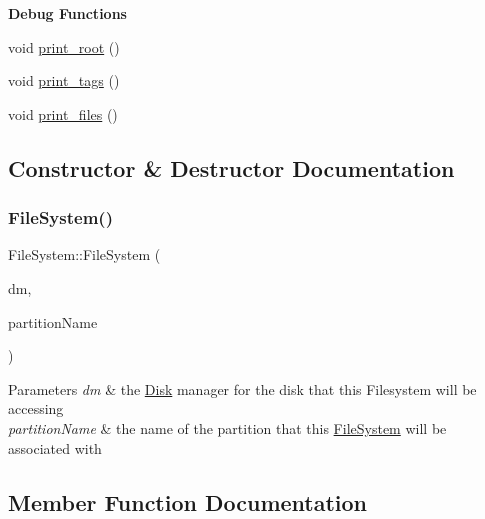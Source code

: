 \begin{Indent}\textbf{ Debug Functions}\par
\begin{DoxyCompactItemize}
\item 
void \mbox{\hyperlink{classFileSystem_a8ec00d561e8d7510358618b249cc60d1}{print\+\_\+root}} ()
\item 
void \mbox{\hyperlink{classFileSystem_ab76af13f044c3ca52e8503a9695685bd}{print\+\_\+tags}} ()
\item 
void \mbox{\hyperlink{classFileSystem_a8d51e4c73c71d91d94ae91355f36bdb1}{print\+\_\+files}} ()
\end{DoxyCompactItemize}
\end{Indent}


\subsection{Constructor \& Destructor Documentation}
\mbox{\label{classFileSystem_a1466c6d1e9636cecd44f0dd68ef710b5}} 
\subsubsection{\texorpdfstring{File\+System()}{FileSystem()}}
{\footnotesize\ttfamily File\+System\+::\+File\+System (\begin{DoxyParamCaption}\item[{\mbox{\hyperlink{classDiskManager}{Disk\+Manager}} $\ast$}]{dm,  }\item[{string}]{partition\+Name }\end{DoxyParamCaption})}


\begin{DoxyParams}{Parameters}
{\em dm} & the \mbox{\hyperlink{classDisk}{Disk}} manager for the disk that this Filesystem will be accessing \\
\hline
{\em partition\+Name} & the name of the partition that this \mbox{\hyperlink{classFileSystem}{File\+System}} will be associated with \\
\hline
\end{DoxyParams}


\subsection{Member Function Documentation}
\mbox{\label{classFileSystem_a3362c6b1cabc3497ac41542e94837e4a}} 
